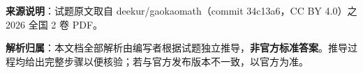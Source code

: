 

\begin{gknotice}
\textbf{来源说明}：试题原文取自 deekur/gaokaomath（commit 34c13a6，CC BY 4.0）之 2026 全国 2 卷 PDF。

\textbf{解析归属}：本文档全部解析由编写者根据试题独立推导，\textbf{非官方标准答案}。推导过程均给出完整步骤以便核验；若与官方发布版本不一致，以官方为准。
\end{gknotice}

\par\medskip


